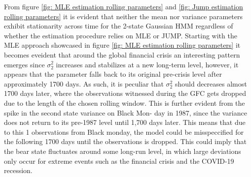 From figure \ref{fig: MLE estimation rolling parameters} and \ref{fig: Jump estimation rolling parameters} it is evident that neither the mean nor variance parameters exhibit stationarity across time
for the 2-state Gaussian HMM regardless of whether the estimation procedure relies on MLE or JUMP. Starting with the MLE approach showcased in figure \ref{fig: MLE estimation rolling parameters} it becomes eveident that around the global financial crisis an interesting pattern emerges since $\sigma_2^2$ increases and stabilizes at a new long-term level, however, it appears that the parameter falls back to its original pre-crisis level after approximately 1700 days. As such, it is peculiar that $\sigma_2^2$ should decreases almost 1700 days later, where the observations witnessed during the GFC gets dropped due to the length of the chosen rolling window. This is further evident from the spike in the second state variance on Black Mon-
day in 1987, since the variance does not return to its pre-1987 level until 1,700 days later. This means that due to this 1 observations from Black monday, the model could be misspeccified for the following 1700 days until the observations is dropped. This could imply that the bear state fluctuates around some long-run level, in which large deviations only occur for extreme events such as the financial crisis and the COVID-19 recession. 

